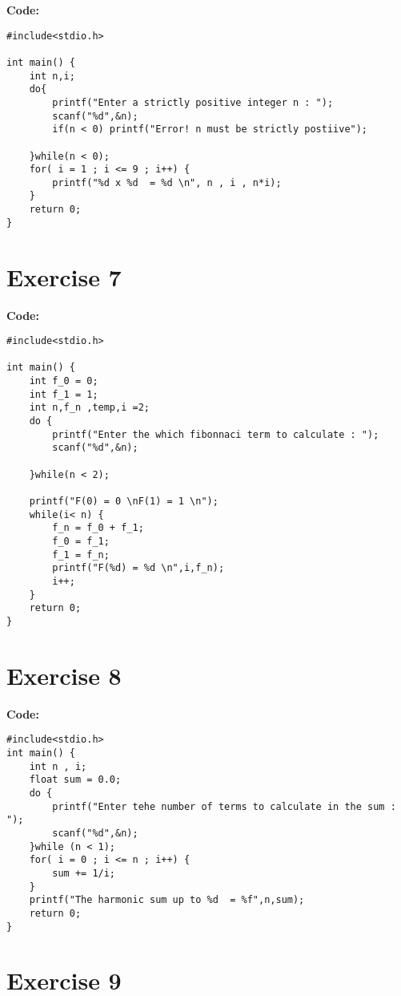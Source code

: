 \documentclass[12pt]{article}
\begin{document}
	\textbf{Code:}
\begin{lstlisting}
#include<stdio.h>

int main() {
    int n,i;
    do{
        printf("Enter a strictly positive integer n : ");
        scanf("%d",&n);
        if(n < 0) printf("Error! n must be strictly postiive");

    }while(n < 0);
    for( i = 1 ; i <= 9 ; i++) {
        printf("%d x %d  = %d \n", n , i , n*i);
    }
    return 0;
}
\end{lstlisting}
	\vspace{1cm}
	
	\section*{Exercise 7}
	\vspace{0.5cm}
	
	\textbf{Code:}
\begin{lstlisting}
#include<stdio.h>

int main() {
    int f_0 = 0;
    int f_1 = 1;
    int n,f_n ,temp,i =2;
    do {
        printf("Enter the which fibonnaci term to calculate : ");
        scanf("%d",&n);

    }while(n < 2);

    printf("F(0) = 0 \nF(1) = 1 \n");
    while(i< n) {
        f_n = f_0 + f_1;
        f_0 = f_1;
        f_1 = f_n;
        printf("F(%d) = %d \n",i,f_n);
        i++;
    }    
    return 0;
}
\end{lstlisting}
	\vspace{1cm}
	
	\section*{Exercise 8}
	\vspace{0.5cm}
	
	\textbf{Code:}
\begin{lstlisting}
#include<stdio.h>
int main() {
    int n , i;
    float sum = 0.0;
    do {
        printf("Enter tehe number of terms to calculate in the sum : ");
        scanf("%d",&n);
    }while (n < 1);
    for( i = 0 ; i <= n ; i++) {
        sum += 1/i;
    }
    printf("The harmonic sum up to %d  = %f",n,sum);
    return 0;
}
\end{lstlisting}
	\vspace{1cm}
	
	\section*{Exercise 9}
	\vspace{0.5cm}
	
\end{document}
